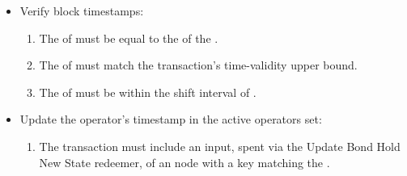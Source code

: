 \documentclass[../midgard.tex]{subfiles}
\begin{document}
\begin{description}
\begin{itemize}
            \item Verify block timestamps:
            \begin{enumerate}[resume]
                \item The  of  must be equal to the  of the .
                \item The  of  must match the transaction's time-validity upper bound.
                \item The  of  must be within the shift interval of .
            \end{enumerate}
            
            \item Update the operator's timestamp in the active operators set:
            \begin{enumerate}[resume]
                \item The transaction must include an input, spent via the Update Bond Hold New State redeemer, of an  node with a key matching the .
            \end{enumerate}
        \end{itemize}


\end{description}
\end{document}
